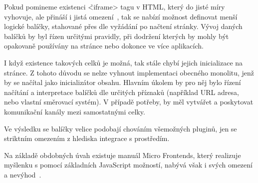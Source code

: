 Pokud pomineme existenci \h{<iframe>} tagu v HTML, který do jisté míry vyhovuje, ale přináší i jistá omezení~\cite{iframes}, tak se nabízí možnost definovat menší logické balíčky, stahované přes  dle vyžádání po načtení stránky.
Vývoj daných balíčků by byl řízen určitými pravidly, při dodržení kterých by mohly být opakovaně používány na stránce nebo dokonce ve více aplikacích.

I když existence takových celků je možná, tak stále chybí jejich inicializace na stránce.
Z tohoto důvodu se nelze vyhnout implementaci obecného monolitu, jenž by se načítal jako inicializátor obsahu.
Hlavním úkolem by pro něj bylo řízení načítání a interpretace balíčků dle určitých příznaků (například URL adresa, nebo vlastní směrovací systém).
V případě potřeby, by měl vytvářet a poskytovat komunikační kanály mezi samostatnými celky.

Ve výsledku se balíčky velice podobají chováním všemožných pluginů, jen se striktním omezením z hlediska integrace s prostředím.

Na základě obdobných úvah existuje manuál Micro Frontends, který realizuje myšlenku s pomocí základních JavaScript možností, nabývá však i svých omezení a nevýhod~\cite{microfrontends}.
